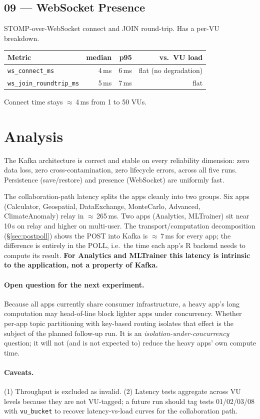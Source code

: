 \documentclass[11pt,a4paper]{article}
\begin{document}
\subsection{09 — WebSocket Presence}

STOMP-over-WebSocket connect and JOIN round-trip. Has a per-VU breakdown.

\begin{tabular}{@{}lrrr@{}}
\toprule
\textbf{Metric} & \textbf{median} & \textbf{p95} & \textbf{vs.\ VU load} \\
\midrule
\texttt{ws\_connect\_ms}        & 4\,ms & 6\,ms & flat (no degradation) \\
\texttt{ws\_join\_roundtrip\_ms} & 5\,ms & 7\,ms & flat \\
\bottomrule
\end{tabular}

\medskip\noindent Connect time stays $\approx$\,4\,ms from 1 to 50 VUs.

\section{Analysis}

The Kafka architecture is correct and stable on every reliability dimension:
zero data loss, zero cross-contamination, zero lifecycle errors, across all
five runs. Persistence (save/restore) and presence (WebSocket) are uniformly
fast.

The collaboration-path latency splits the apps cleanly into two groups. Six
apps (Calculator, Geospatial, DataExchange, MonteCarlo, Advanced,
ClimateAnomaly) relay in $\approx$\,265\,ms. Two apps (Analytics, MLTrainer)
sit near 10\,s on relay and higher on multi-user. The transport/computation
decomposition (\S\ref{sec:postpoll}) shows the POST into Kafka is $\approx$\,7\,ms
for every app; the difference is entirely in the POLL, i.e.\ the time each
app's R backend needs to compute its result. \textbf{For Analytics and
MLTrainer this latency is intrinsic to the application, not a property of
Kafka.}

\paragraph{Open question for the next experiment.} Because all apps currently
share consumer infrastructure, a heavy app's long computation may
head-of-line block lighter apps under concurrency. Whether per-app topic
partitioning with key-based routing isolates that effect is the subject of the
planned follow-up run. It is an \emph{isolation-under-concurrency} question;
it will not (and is not expected to) reduce the heavy apps' own compute time.

\paragraph{Caveats.} (1) Throughput is excluded as invalid. (2) Latency tests
aggregate across VU levels because they are not VU-tagged; a future run should
tag tests 01/02/03/08 with \texttt{vu\_bucket} to recover latency-vs-load
curves for the collaboration path.
\end{document}
